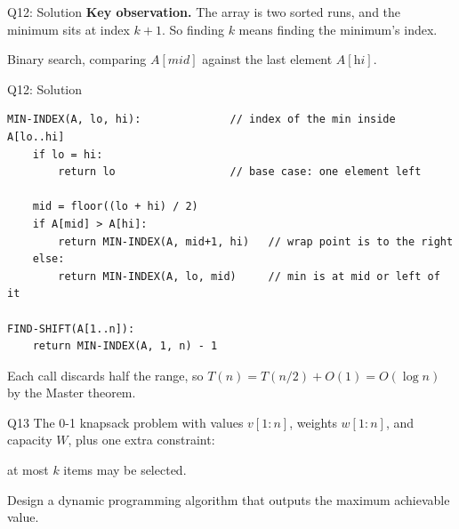 \documentclass[10pt,aspectratio=169]{beamer}
\begin{document}
\begin{frame}{Q12: Solution}
  \textbf{Key observation.} The array is two sorted runs, and the
  \alert{minimum} sits at index $k+1$. So finding $k$ means finding the
  minimum's index.

  \bigskip
  Binary search, comparing $A[\textit{mid}]$ against the last element
  $A[\textit{hi}]$.

  \bigskip
  \begin{center}
  \end{center}
\end{frame}

\begin{frame}[fragile]{Q12: Solution}
  \begin{lstlisting}[style=pc]
MIN-INDEX(A, lo, hi):              // index of the min inside A[lo..hi]
    if lo = hi:
        return lo                  // base case: one element left

    mid = floor((lo + hi) / 2)
    if A[mid] > A[hi]:
        return MIN-INDEX(A, mid+1, hi)   // wrap point is to the right
    else:
        return MIN-INDEX(A, lo, mid)     // min is at mid or left of it

FIND-SHIFT(A[1..n]):
    return MIN-INDEX(A, 1, n) - 1
  \end{lstlisting}

  \bigskip
  Each call discards half the range, so
  $T(n) = T(n/2) + O(1) = O(\log n)$ by the Master theorem.
\end{frame}


\begin{frame}{Q13}
  The 0-1 knapsack problem with values $v[1:n]$, weights $w[1:n]$, and capacity
  $W$, plus one extra constraint:

  \bigskip
  \begin{center}
    \alert{at most $k$ items may be selected.}
  \end{center}

  \bigskip
  Design a dynamic programming algorithm that outputs the maximum achievable
  value.
\end{frame}
\end{document}
